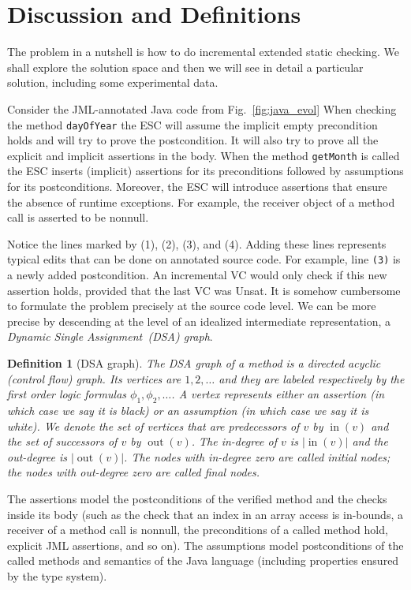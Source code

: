 \documentclass{llncs}
\def\lstinlinen{\lstinline[basicstyle=\normalsize\sffamily]}
\newtheorem{DEF}{Definition}
\DeclareMathOperator{\preV}{in}
\DeclareMathOperator{\postV}{out}
\def\unsat{{\sc Unsat}}
\def\seq#1{#1_1, #1_2, \ldots}
\begin{document}
\section{Discussion and Definitions}
\label{sec:discussion}

The problem in a nutshell is how to do incremental extended static
checking. We shall explore the solution space and then we will
see in detail a particular solution, including some experimental
data.

Consider the JML-annotated Java code from Fig.~\ref{fig:java_evol} 
When checking the method 
\lstinlinen|dayOfYear| the ESC will assume 
the implicit empty precondition holds and will try to prove the postcondition.
It will also try to prove all the explicit and implicit assertions 
in the body. When the method \lstinlinen|getMonth| is called the
ESC inserts (implicit) assertions for its preconditions followed
by assumptions for its postconditions. Moreover, the ESC will
introduce assertions that ensure the absence of runtime exceptions.
For example, the receiver object of a method call is asserted
to be nonnull.

Notice the lines marked by (1), (2), (3), and (4). Adding these
lines represents typical edits that can be done on annotated source code.
For example, line \lstinlinen|(3)| is a newly added postcondition.
An incremental VC would only check if this new assertion
holds, provided that the last VC was \unsat. It is somehow cumbersome to
formulate the problem precisely at the source code level. We can be
more precise by descending at the level of an idealized
intermediate representation, a \emph{Dynamic Single Assignment~(DSA)
graph}.

\begin{DEF}[DSA graph]
The \emph{DSA graph} of a method is a directed acyclic (control 
flow) graph. Its vertices are $1, 2, \ldots$ and they
are labeled respectively by the first order logic formulas
$\seq\phi$. A vertex represents either an \emph{assertion}
(in which case we say it is \emph{black}) or an \emph{assumption}
(in which case we say it is \emph{white}). 
We denote the set
of vertices that are predecessors of $v$ by $\preV(v)$ and the
set of successors of $v$ by $\postV(v)$. The \emph{in-degree}
of $v$ is $|\preV(v)|$ and the \emph{out-degree} is $|\postV(v)|$.
The nodes with in-degree zero are called \emph{initial nodes};
the nodes with out-degree zero are called \emph{final nodes}.
\end{DEF}

\noindent
The assertions model the postconditions of the verified method 
and the checks inside its body (such as the check that an index 
in an array access is in-bounds, a receiver of a method call is 
nonnull, the preconditions of a called method hold, explicit
JML assertions, and so on). The assumptions model postconditions 
of the called methods and semantics of the Java language 
(including properties ensured by the type system). 
\end{document}
